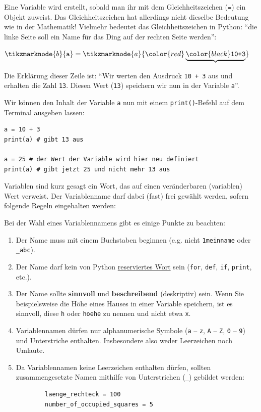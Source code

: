 Eine Variable wird erstellt, sobald man ihr mit dem Gleichheitszeichen (\lstinline|=|) ein Objekt zuweist. Das Gleichheitszeichen hat allerdings nicht dieselbe Bedeutung wie in der Mathematik! Vielmehr bedeutet das Gleichheitszeichen in Python: \enquote{die linke Seite soll ein Name für das Ding auf der rechten Seite werden}:
\begin{center}
	$ \tikzmarknode{b}{\text{\texttt{a}}} =\tikzmarknode{a}{\color{red}\underbrace{\color{black}\text{\texttt{10+3}}}}$
\end{center}

Die Erklärung dieser Zeile ist: \enquote{Wir werten den Ausdruck \lstinline|10 + 3| aus und erhalten die Zahl \lstinline|13|. Diesen Wert (\lstinline|13|) speichern wir nun in der Variable \lstinline|a|}.

Wir können den Inhalt der Variable \lstinline|a| nun mit einem \lstinline|print()|-Befehl auf dem Terminal ausgeben lassen:

\begin{lstlisting}
a = 10 + 3
print(a) # gibt 13 aus

a = 25 # der Wert der Variable wird hier neu definiert
print(a) # gibt jetzt 25 und nicht mehr 13 aus
\end{lstlisting}

Variablen sind kurz gesagt ein Wort, das auf einen veränderbaren (variablen) Wert verweist. Der Variablenname darf dabei (fast) frei gewählt werden, sofern folgende Regeln eingehalten werden:

\begin{myoverview}
	Bei der Wahl eines Variablennamens gibt es einige Punkte zu beachten:
	\begin{enumerate}
		\item Der Name muss mit einem Buchstaben beginnen (e.g. nicht \verb|1meinname| oder \verb|_abc|).
		\item Der Name darf kein von Python \href{https://www.programiz.com/python-programming/keyword-list}{reserviertes Wort} sein (\lstinline|for|, \lstinline|def|, \lstinline|if|, \lstinline|print|, etc.).
		\item Der Name sollte \textbf{sinnvoll} und \textbf{beschreibend} (deskriptiv) sein. Wenn Sie beispielsweise die Höhe eines Hauses in einer Variable speichern, ist es sinnvoll, diese \lstinline|h| oder \lstinline|hoehe| zu nennen und nicht etwa \lstinline|x|.
		\item Variablennamen dürfen nur alphanumerische Symbole (\texttt{a} -- \texttt{z}, \texttt{A} -- \texttt{Z}, \texttt{0} -- \texttt{9}) und Unterstriche enthalten. Insbesondere also weder Leerzeichen noch Umlaute.
		\item Da Variablennamen keine Leerzeichen enthalten dürfen, sollten zusammengesetzte Namen mithilfe von Unterstrichen (\lstinline{_}) gebildet werden:
		      \begin{lstlisting}
		laenge_rechteck = 100
		number_of_occupied_squares = 5
		\end{lstlisting}
	\end{enumerate}
\end{myoverview}

